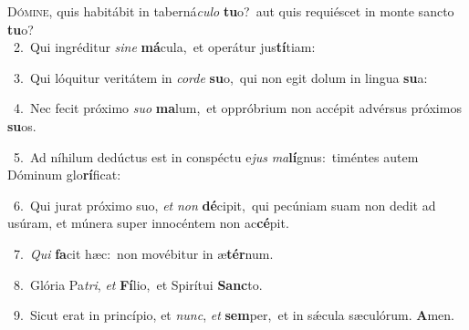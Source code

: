 \lettrine{\initial\textcolor{\initialcolor}{D}}{ómine,} quis habitábit in taberná\-\textit{cu}\-\textit{lo} \textbf{tu}\-o?~\star aut quis requiéscet in monte sancto \textbf{tu}\-o?\\
{\numbfont\textcolor{\numbcolor}{~2.}}~Qui ingréditur \textit{si}\-\textit{ne} \textbf{má}\-cula,~\star et operátur jus\-\textbf{tí}\-tiam:\par
{\numbfont\textcolor{\numbcolor}{~3.}}~Qui lóquitur veritátem in \textit{cor}\-\textit{de} \textbf{su}\-o,~\star qui non egit dolum in lingua \textbf{su}\-a:\par
{\numbfont\textcolor{\numbcolor}{~4.}}~Nec fecit próximo \textit{su}\-\textit{o} \textbf{ma}\-lum,~\star et oppróbrium non accépit advérsus próximos \textbf{su}\-os.\par
{\numbfont\textcolor{\numbcolor}{~5.}}~Ad níhilum dedúctus est in conspéctu e\textit{jus} \textit{ma}\-\textbf{lí}gnus:~\star timéntes autem Dóminum glo\-\textbf{rí}\-ficat:\par
{\numbfont\textcolor{\numbcolor}{~6.}}~Qui jurat próximo suo, \textit{et} \textit{non} \textbf{dé}\-cipit,~\star qui pecúniam suam non dedit ad usúram, et múnera super innocéntem non ac\-\textbf{cé}\-pit.\par
{\numbfont\textcolor{\numbcolor}{~7.}}~\textit{Qui} \textbf{fa}\-cit hæc:~\star non movébitur in æ\-\textbf{tér}\-num.\par
{\numbfont\textcolor{\numbcolor}{~8.}}~Glória Pa\-\textit{tri}\-, \textit{et} \textbf{Fí}\-lio,~\star et Spirítui \textbf{Sanc}\-to.\par
{\numbfont\textcolor{\numbcolor}{~9.}}~Sicut erat in princípio, et \textit{nunc}\-, \textit{et} \textbf{sem}\-per,~\star et in sǽcula sæculórum. \textbf{A}\-men.\par
